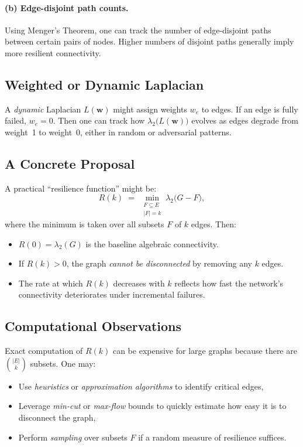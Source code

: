 \documentclass[../../../OAE-SPEC-MAIN.tex]{subfiles}
\begin{document}
\paragraph{(b) Edge-disjoint path counts.}
Using Menger's Theorem, one can track the number of edge-disjoint paths between certain pairs of nodes. Higher numbers of disjoint paths generally imply more resilient connectivity.

\subsection{Weighted or Dynamic Laplacian}

A \emph{dynamic} Laplacian $L(\mathbf{w})$ might assign weights $w_e$ to edges. If an edge is fully failed, $w_e=0$. Then one can track how $\lambda_2\bigl(L(\mathbf{w})\bigr)$ evolves as edges degrade from weight~1 to weight~0, either in random or adversarial patterns.

\subsection{A Concrete Proposal}

A practical ``resilience function'' might be:
\[
  R(k)
  \;=\;
  \min_{\substack{F \subseteq E\\|F| = k}}
  \lambda_2\!\bigl(G - F\bigr),
\]
where the minimum is taken over all subsets $F$ of $k$ edges. Then:
\begin{itemize}
\item $R(0) = \lambda_2(G)$ is the baseline algebraic connectivity.
\item If $R(k) > 0$, the graph \emph{cannot be disconnected} by removing any $k$ edges. 
\item The rate at which $R(k)$ decreases with $k$ reflects how fast the network's connectivity deteriorates under incremental failures.
\end{itemize}

\subsection{Computational Observations}
Exact computation of $R(k)$ can be expensive for large graphs because there are $\binom{|E|}{k}$ subsets. One may:
\begin{itemize}
\item Use \emph{heuristics} or \emph{approximation algorithms} to identify critical edges,
\item Leverage \emph{min-cut} or \emph{max-flow} bounds to quickly estimate how easy it is to disconnect the graph,
\item Perform \emph{sampling} over subsets $F$ if a random measure of resilience suffices.
\end{itemize}
\end{document}
